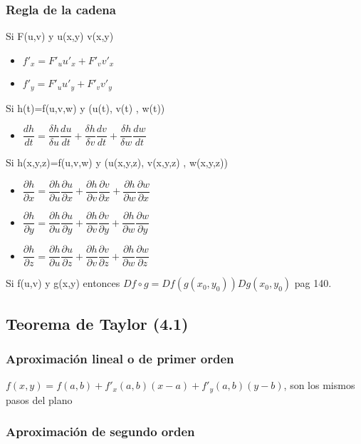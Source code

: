 \subsubsection{Regla de la cadena}
Si F(u,v) y u(x,y) v(x,y)
\begin{itemize}
	\item $f'_x=F'_uu'_x+F'_vv'_x$
	\item $f'_y=F'_uu'_y+F'_vv'_y$
\end{itemize}

Si h(t)=f(u,v,w) y (u(t), v(t) , w(t))
\begin{itemize}
	\item $\dfrac{dh}{dt}=\dfrac{\delta h}{\delta u}\dfrac{du}{dt}+\dfrac{\delta h}{\delta v}\dfrac{dv}{dt}+\dfrac{\delta h}{\delta w}\dfrac{dw}{dt}$
\end{itemize}

Si h(x,y,z)=f(u,v,w) y (u(x,y,z), v(x,y,z) , w(x,y,z))
\begin{itemize}
	\item $\dfrac{\partial h}{\partial x}=\dfrac{\partial h}{\partial u}\dfrac{\partial u}{\partial x}+\dfrac{\partial h}{\partial v}\dfrac{\partial v}{\partial x}+\dfrac{\partial h}{\partial w}\dfrac{\partial w}{\partial x}$
	\item $\dfrac{\partial h}{\partial y}=\dfrac{\partial h}{\partial u}\dfrac{\partial u}{\partial y}+\dfrac{\partial h}{\partial v}\dfrac{\partial v}{\partial y}+\dfrac{\partial h}{\partial w}\dfrac{\partial w}{\partial y}$
	\item $\dfrac{\partial h}{\partial z}=\dfrac{\partial h}{\partial u}\dfrac{\partial u}{\partial z}+\dfrac{\partial h}{\partial v}\dfrac{\partial v}{\partial z}+\dfrac{\partial h}{\partial w}\dfrac{\partial w}{\partial z}$
\end{itemize}

Si f(u,v) y g(x,y) entonces $Df\circ g=Df(g(x_0,y_0))Dg(x_0,y_0)$ pag 140.

\subsection{Teorema de Taylor (4.1)}
\subsubsection{Aproximación lineal o de primer orden}

$f(x,y)=f(a,b)+f'_x(a,b)(x-a)+f'_y(a,b)(y-b)$, son los mismos pasos del plano

\subsubsection{Aproximación de segundo orden}

